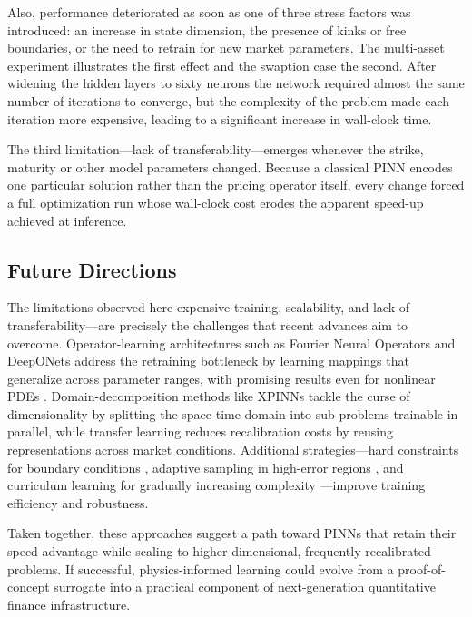 \documentclass[12pt]{report} %
\theoremstyle{plain} %
\theoremstyle{definition} %
\theoremstyle{remark} %
\begin{document}
Also, performance deteriorated as soon as one of three stress factors was introduced: an increase in 
state dimension, the presence of kinks or free boundaries, or the need to retrain for new market 
parameters. The multi-asset experiment illustrates the first effect and the swaption case the second. 
After widening the hidden layers to sixty neurons the network required almost the same number of iterations to converge, 
but the complexity of the problem made each iteration more expensive, leading to a significant increase in wall-clock time.

The third limitation—lack of transferability—emerges whenever the strike, maturity or other model parameters changed. Because a 
classical PINN encodes one particular solution rather than the pricing operator itself, every 
change forced a full optimization run whose wall-clock cost erodes the apparent speed-up achieved 
at inference.

\subsection{Future Directions}

The limitations observed here-expensive training, scalability, and lack of transferability—are precisely the challenges that recent advances aim to overcome. 
Operator-learning architectures such as Fourier Neural Operators 
\cite{li2021fourierneuraloperatorparametric} and DeepONets \cite{deeponets} 
address the retraining bottleneck by learning mappings that generalize across 
parameter ranges, with promising results even for nonlinear PDEs \cite{LI2025128675}. 
Domain-decomposition methods like XPINNs \cite{CiCP-28-5} tackle the curse of 
dimensionality by splitting the space-time domain into sub-problems trainable 
in parallel, while transfer learning \cite{pellegrin2022transferlearningphysicsinformedneural, Gao_2022} 
reduces recalibration costs by reusing representations across market conditions. 
Additional strategies—hard constraints for boundary conditions \cite{LI202460}, 
adaptive sampling in high-error regions \cite{WU2023115671}, and curriculum 
learning for gradually increasing complexity \cite{bekele2024physicsinformedneuralnetworkscurriculum}—improve training 
efficiency and robustness.

Taken together, these approaches suggest a path toward PINNs that retain their 
speed advantage while scaling to higher-dimensional, frequently recalibrated problems. 
If successful, physics-informed learning could evolve from a proof-of-concept surrogate 
into a practical component of next-generation quantitative finance infrastructure.



\clearpage
{}

\printbibliography
\end{document}
